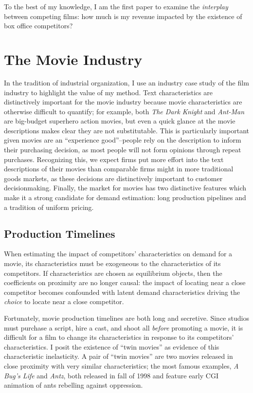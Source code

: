 \documentclass{article}
\begin{document}
To the best of my knowledge, I am the first paper to examine the \emph{interplay} between competing films: how much is my revenue impacted by the existence of box office competitors?


\section{The Movie Industry}

In the tradition of industrial organization, I use an industry case study of the film industry to highlight the value of my method. Text characteristics are distinctively important for the movie industry because movie characteristics are otherwise difficult to quantify; for example, both \emph{The Dark Knight} and \emph{Ant-Man} are big-budget superhero action movies, but even a quick glance at the movie descriptions makes clear they are not substitutable. This is particularly important given movies are an ``experience good''--people rely on the description to inform their purchasing decision, as most people will not form opinions through repeat purchases. Recognizing this, we expect firms put more effort into the text descriptions of their movies than comparable firms might in more traditional goods markets, as these decisions are distinctively important to customer decisionmaking. Finally, the market for movies has two distinctive features which make it a strong candidate for demand estimation: long production pipelines and a tradition of uniform pricing.

\subsection{Production Timelines}

When estimating the impact of competitors' characteristics on demand for a movie, its characteristics must be exogeneous to the characteristics of its competitors. If characteristics are chosen as equilibrium objects, then the coefficients on proximity are no longer causal: the impact of locating near a close competitor becomes confounded with latent demand characteristics driving the \emph{choice} to locate near a close competitor. 

Fortunately, movie production timelines are both long and secretive. Since studios must purchase a script, hire a cast, and shoot all \emph{before} promoting a movie, it is difficult for a film to change its characteristics in response to its competitors' characteristics. I posit the existence of ``twin movies'' as evidence of this characteristic inelasticity. A pair of ``twin movies'' are two movies released in close proximity with very similar characteristics; the most famous examples, \emph{A Bug's Life} and \emph{Antz}, both released in fall of 1998 and feature early CGI animation of ants rebelling against oppression.
\end{document}
